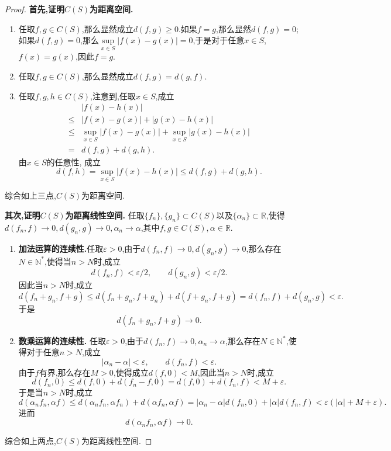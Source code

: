 \documentclass[lang = cn, scheme = chinese]{elegantbook}
\newcommand{\R}{\mathbb{R}}            %
\begin{document}
	\begin{proof}
		{\bf 首先,证明$C(S)$为距离空间.}
		
		\begin{enumerate}
			
			\item 任取$f,g\in C(S)$,那么显然成立$d(f,g)\ge 0$.如果$f=g$,那么显然$d(f,g)=0$;如果$d(f,g)=0$,那么$\sup\limits_{x\in S}|f(x)-g(x)|=0$,于是对于任意$x\in S$,$f(x)=g(x)$,因此$f=g$.
			
			\item 任取$f,g\in C(S)$,那么显然成立$d(f,g)=d(g,f)$.
			
			\item 任取$f,g,h\in C(S)$,注意到,任取$x\in S$,成立
			\begin{align*}
				&|f(x)-h(x)|\\
				\le&|f(x)-g(x)|+|g(x)-h(x)|\\
				\le&\sup_{x\in S}|f(x)-g(x)|+\sup_{x\in S}|g(x)-h(x)|\\
				=&d(f,g)+d(g,h).
			\end{align*}
			由$x\in S$的任意性, 成立
			$$
			d(f,h)=\sup_{x\in S}|f(x)-h(x)|\le d(f,g)+d(g,h).
			$$
		\end{enumerate}
		
		综合如上三点,$C(S)$为距离空间.
		
		{\bf 其次,证明$C(S)$为距离线性空间.} 任取$\{f_n\},\{g_n\}\subset C(S)$以及$\{\alpha_n\}\subset \R$,使得$d(f_n,f)\to 0,d(g_n,g)\to 0,\alpha_n\to \alpha$,其中$f,g\in C(S),\alpha\in\R$.
		
		\begin{enumerate}
			\item {\bf 加法运算的连续性.}任取$\varepsilon>0$,由于$d(f_n,f)\to 0,d(g_n,g)\to 0$,那么存在$N\in\mathbb{N}^*$,使得当$n>N$时,成立
			$$
			d(f_n,f)<\varepsilon/2,\qquad 
			d(g_n,g)<\varepsilon/2.
			$$
			因此当$n>N$时,成立
			$$
			d(f_n+g_n,f+g)\le d(f_n+g_n,f+g_n)+d(f+g_n,f+g)=d(f_n,f)+d(g_n,g)<\varepsilon.
			$$
			于是
			$$
			d(f_n+g_n,f+g)\to 0.
			$$
			
			\item {\bf 数乘运算的连续性.} 任取$\varepsilon>0$,由于$d(f_n,f)\to 0,\alpha_n\to \alpha$,那么存在$N\in\mathbb{N}^*$,使得对于任意$n>N$,成立
			$$
			|\alpha_n-\alpha|<\varepsilon,\qquad 
			d(f_n,f)<\varepsilon.
			$$
			由于$f$有界,那么存在$M>0$,使得成立$d(f,0)<M$,因此当$n>N$时,成立
			$$
			d(f_n,0)\le d(f,0)+d(f_n-f,0)=d(f,0)+d(f_n,f)<M+\varepsilon.
			$$
			于是当$n>N$时,成立
			$$
			d(\alpha_n f_n,\alpha f)
			\le d(\alpha_n f_n,\alpha f_n)+d(\alpha f_n,\alpha f)
			= |\alpha_n-\alpha|d(f_n,0)+|\alpha|d(f_n,f)
			< \varepsilon(|\alpha|+M+\varepsilon).
			$$
			进而
			$$
			d(\alpha_n f_n,\alpha f)\to 0.
			$$
		\end{enumerate}
		
		综合如上两点,$C(S)$为距离线性空间.
	\end{proof}
	
\end{document}
